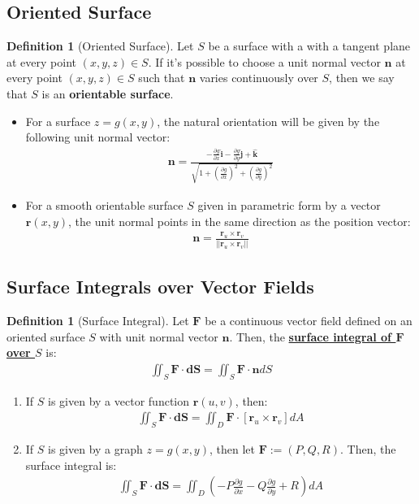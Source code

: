 \documentclass[reqno,11pt]{amsart}
\theoremstyle{definition}
\newtheorem{definition}[theorem]{Definition}
\theoremstyle{remark}
\newcommand{\dfn}[1]{\underline{\textbf{#1}}}
\begin{document}
\subsection{Oriented Surface}
\begin{definition}[Oriented Surface]
	Let $S$ be a surface with a with a tangent plane at every point $(x,y,z) \in S$. If it's possible to choose a unit normal vector $\mathbf{n}$ at every point $(x,y,z) \in S$ such that $\mathbf{n}$ varies continuously over $S$, then we say that $S$ is an \textbf{orientable surface}.
\end{definition}
\begin{itemize}
	\item For a surface $z = g(x,y)$, the natural orientation will be given by the following unit normal vector:
	\begin{align}
		\mathbf{n} = \frac{- \frac{\partial g}{\partial x} \mathbf{\hat{i}} - \frac{\partial g}{\partial y}\mathbf{\hat{j}} + \mathbf{\hat{k}} }{\sqrt{1 + \left( \frac{\partial g}{\partial x} \right)^2 + \left( \frac{\partial g}{\partial y} \right)^2}}	
	\end{align}
	\item For a smooth orientable surface $S$ given in parametric form by a vector $\mathbf{r}(x,y)$, the unit normal points in the same direction as the position vector:
	\begin{align}
		\mathbf{n} = \frac{\mathbf{r}_u \times \mathbf{r}_v}{||\mathbf{r}_u \times \mathbf{r}_v ||}	
	\end{align}

\end{itemize}


\subsection{Surface Integrals over Vector Fields}
\begin{definition}[Surface Integral]
	Let $\mathbf{F}$ be a continuous vector field defined on an oriented surface $S$ with unit normal vector $\mathbf{n}$. Then, the \dfn{surface integral of $\mathbf{F}$ over $S$} is: 
	\begin{align}
		\iint_S \mathbf{F} \cdot \mathbf{dS} = \iint_S \mathbf{F} \cdot \mathbf{n} dS 	
	\end{align}
\end{definition}

\begin{enumerate}
	\item If $S$ is given by a vector function $\mathbf{r}(u,v)$, then: 
	\begin{align}
		\iint_S \mathbf{F} \cdot \mathbf{dS} = \iint_D \mathbf{F} \cdot [\mathbf{r}_u \times \mathbf{r}_v] dA 	
	\end{align}
	\item If $S$ is given by a graph $z = g(x,y)$, then let $\mathbf{F} := (P, Q, R)$. Then, the surface integral is: 
	\begin{align}
		\iint_S \mathbf{F} \cdot \mathbf{dS} = \iint_D \left( - P \frac{\partial g}{\partial x} - Q \frac{\partial g}{\partial y} + R \right) dA 	
	\end{align}
\end{enumerate}
\end{document}
